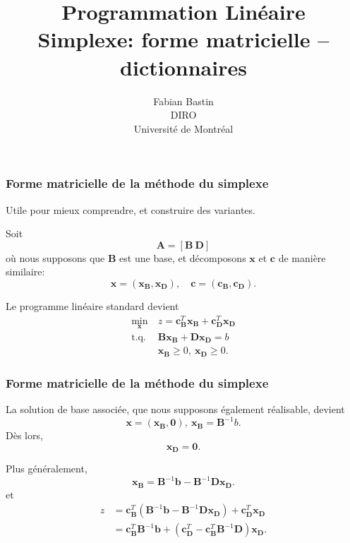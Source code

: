 \documentclass[usepdftitle=false]{beamer}
\title[Simplexe révisé]{Programmation Linéaire\\Simplexe: forme matricielle -- dictionnaires}
\author[Fabian Bastin]{Fabian Bastin\\DIRO\\Université de Montréal}
\date{}
\def\bb{\boldsymbol{b}}
\def\bc{\boldsymbol{c}}
\def\bx{\boldsymbol{x}}
\def\bA{\boldsymbol{A}}
\def\bB{\boldsymbol{B}}
\def\bD{\boldsymbol{D}}
\def\bzero{\boldsymbol{0}}
\begin{document}
\frame{\titlepage}


\begin{frame}
\frametitle{Forme matricielle de la méthode du simplexe}

Utile pour mieux comprendre, et construire des variantes.

\mbox{}

Soit
\[
\bA = [ \bB\ \bD ]
\]
où nous supposons que $\bB$ est une base, et décomposons $\bx$ et $\bc$ de manière similaire:
\[
\bx = (\bx_{\bB}, \bx_{\bD}), \quad \bc = (\bc_{\bB}, \bc_{\bD}).
\]

\mbox{}

Le programme linéaire standard devient
\begin{align*}
\min_{\bx} \ & 
z = \bc_{\bB}^T\bx_{\bB} + \bc_{\bD}^T \bx_{\bD} \\
\mbox{t.q. } & \bB\bx_{\bB} + \bD\bx_{\bD} = b \\
& \bx_{\bB} \geq 0,\ \bx_{\bD} \geq 0.
\end{align*}

\end{frame}

\begin{frame}
\frametitle{Forme matricielle de la méthode du simplexe}

La solution de base associée, que nous supposons également réalisable, devient
\[
 \bx = (\bx_{\bB}, \bzero), \ \bx_{\bB} = \bB^{-1} b.
\]
Dès lors,
\[
 \bx_{\bD} = \bzero.
\]

\mbox{}

Plus généralement,
\[
  \bx_{\bB} = \bB^{-1} \bb - \bB^{-1}\bD\bx_{\bD}.
\]
et
\begin{align*}
z &= \bc_{\bB}^T\left(\bB^{-1} \bb - \bB^{-1}\bD\bx_{\bD}\right)
 + \bc_{\bD}^T \bx_{\bD} \\
 & = \bc_{\bB}^T \bB^{-1} \bb + \left( \bc_{\bD}^T - \bc_{\bB}^T \bB^{-1} \bD \right) \bx_{\bD}. 
 \end{align*}

\end{frame}
\end{document}
